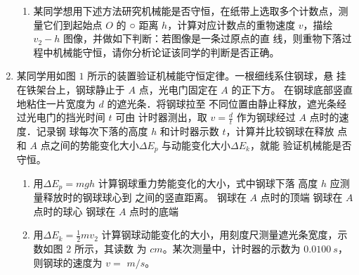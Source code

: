 \begin{enumerate}
\begin{enumerate}
\item
某同学想用下述方法研究机械能是否守恒，在纸带上选取多个计数点，测量它们到起始点 $ O $ 的
○
距离 $ h $，计算对应计数点的重物速度 $ v $，描绘 $ v_{2} -h $ 图像，并做如下判断：若图像是一条过原点的直
线，则重物下落过程中机械能守恒，请你分析论证该同学的判断是否正确。



\end{enumerate}



\newpage
\item 
{}
某同学用如图 $ 1 $ 所示的装置验证机械能守恒定律。一根细线系住钢球，悬
挂在铁架台上，钢球静止于 $ A $ 点，光电门固定在 $ A $ 的正下方。
在钢球底部竖直地粘住一片宽度为 $ d $ 的遮光条．将钢球拉至
不同位置由静止释放，遮光条经过光电门的挡光时间 $ t $ 可由
计时器测出，取 $v=\frac{d}{t}$
作为钢球经过 $ A $ 点时的速度．记录钢
球每次下落的高度 $ h $ 和计时器示数 $ t $，计算并比较钢球在释放
点和 $ A $ 点之间的势能变化大小$ \Delta E_{p} $ 与动能变化大小$ \Delta E_{k} $，就能
验证机械能是否守恒。
\begin{figure}[h!]
\centering

\end{figure}

\begin{enumerate}
\renewcommand{\labelenumi}{\arabic{enumi}.}
\item
用$ \Delta E_{p} =mgh $ 计算钢球重力势能变化的大小，式中钢球下落
高度 $ h $ 应测量释放时的钢球球心到  之间的竖直距离。
\threechoices
{钢球在 $ A $ 点时的顶端}
{钢球在 $ A $ 点时的球心}
{钢球在 $ A $ 点时的底端}



\item 
用$ \Delta E_{k} = \frac{ 1 }{ 2 } m v_{2} $ 计算钢球动能变化的大小，用刻度尺测量遮光条宽度，示数如图 $ 2 $ 所示，其读数
为  $ cm $。某次测量中，计时器的示数为 $ 0.0100 \ s $，则钢球的速度为 $ v=$  $m/s $。
\begin{figure}[h!]
\centering

\end{figure}




\end{enumerate}
\end{enumerate}
